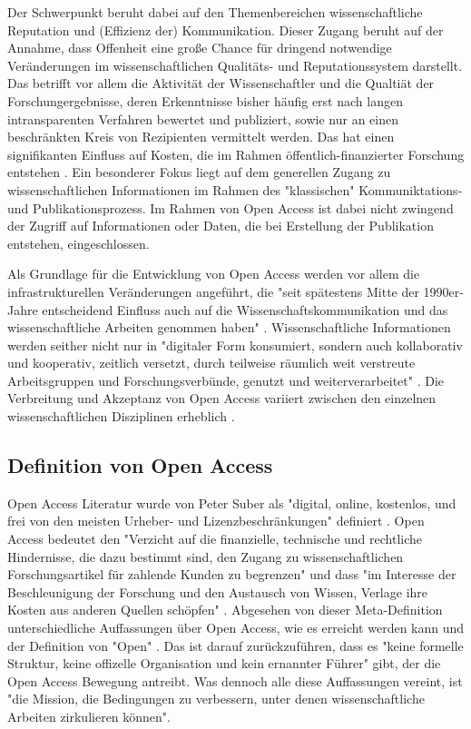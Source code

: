 Der Schwerpunkt beruht dabei auf den Themenbereichen wissenschaftliche Reputation und (Effizienz der) Kommunikation. Dieser Zugang beruht auf der Annahme, dass Offenheit eine große Chance für dringend notwendige Veränderungen im wissenschaftlichen Qualitäts- und Reputationssystem darstellt. Das betrifft vor allem die Aktivität der Wissenschaftler und die Qualtiät der Forschungergebnisse, deren Erkenntnisse bisher häufig erst nach langen intransparenten Verfahren bewertet und publiziert, sowie nur an einen beschränkten Kreis von Rezipienten vermittelt werden. Das hat einen signifikanten Einfluss auf Kosten, die im Rahmen öffentlich-finanzierter Forschung entstehen \cite{suchen}. Ein besonderer Fokus liegt auf dem generellen Zugang zu wissenschaftlichen Informationen im Rahmen des "klassischen" Kommuniktations- und Publikationsprozess. Im Rahmen von Open Access ist dabei nicht zwingend der Zugriff auf Informationen oder Daten, die bei Erstellung der Publikation entstehen, eingeschlossen. 

Als Grundlage für die Entwicklung von Open Access werden vor allem die infrastrukturellen Veränderungen angeführt, die "seit spätestens Mitte der 1990er-Jahre entscheidend Einfluss auch auf die Wissenschaftskommunikation und das wissenschaftliche Arbeiten genommen haben" \cite{schulze_2013_open}. Wissenschaftliche Informationen werden seither nicht nur in "digitaler Form konsumiert, sondern auch kollaborativ und kooperativ, zeitlich versetzt, durch teilweise räumlich weit verstreute Arbeitsgruppen und Forschungsverbünde, genutzt und weiterverarbeitet" \cite{schulze_2013_open}. Die Verbreitung und Akzeptanz von Open Access variiert zwischen den einzelnen wissenschaftlichen Disziplinen erheblich \cite{cite:21a}.

\subsection{Definition von Open Access}

Open Access Literatur wurde von Peter Suber als "digital, online, kostenlos, und frei von den meisten Urheber- und Lizenzbeschränkungen" \cite{suber_2012_open} definiert \cite{Adema_2014_open_access}. Open Access bedeutet den "Verzicht auf die finanzielle, technische und rechtliche Hindernisse, die dazu bestimmt sind, den Zugang zu wissenschaftlichen Forschungsartikel für zahlende Kunden zu begrenzen" und dass "im Interesse der Beschleunigung der Forschung und den Austausch von Wissen, Verlage ihre Kosten aus anderen Quellen schöpfen" \cite{Suber_2002}. Abgesehen von dieser Meta-Definition unterschiedliche Auffassungen über Open Access, wie es erreicht werden kann und der Definition von "Open" \cite{Adema_2014_open_access}. Das ist  darauf zurückzuführen, dass es "keine formelle Struktur, keine offizelle Organisation und kein ernannter Führer" gibt, der die Open Access Bewegung antreibt\cite{poynder_2011_suber}. Was dennoch alle diese Auffassungen vereint, ist "die Mission, die Bedingungen zu verbessern, unter denen wissenschaftliche Arbeiten zirkulieren können"\cite{Adema_2014_open_access}.


